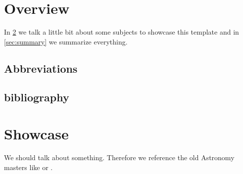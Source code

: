 

\chapter{Overview}\label{sec:overview}

In \cref{sec:main} we talk a little bit about some subjects to showcase this template and in \cref{sec:summary} we summarize everything.

\section{Abbreviations}


\section{bibliography}


\section{}




\chapter{Showcase}\label{sec:main}

We should talk about something. Therefore we reference the old Astronomy masters like \citet{Newton+1687} or \citet{Hubble+1929}. 

